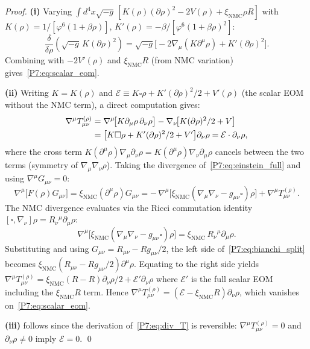 \documentclass[11pt,a4paper]{article}
\theoremstyle{definition}
\theoremstyle{remark}
\newcommand{\vp}{\varphi}
\newcommand{\xNMC}{\xi_{\mathrm{NMC}}}
\begin{document}
\begin{proof}
\textbf{(i)} Varying $\int\!d^4x\sqrt{-g}\,[K(\rho)(\partial\rho)^2 - 2V(\rho) + \xNMC\rho R]$
with $K(\rho)=1/[\vp^6(1+\beta\rho)]$, $K'(\rho)=-\beta/[\vp^6(1+\beta\rho)^2]$:
\begin{equation*}
  \frac{\delta}{\delta\rho}(\sqrt{-g}\,K(\partial\rho)^2)
  = \sqrt{-g}\bigl[-2\nabla_\mu(K\partial^\mu\rho) + K'(\partial\rho)^2\bigr].
\end{equation*}
Combining with $-2V'(\rho)$ and $\xNMC R$ (from NMC variation) gives~\eqref{P7:eq:scalar_eom}.

\textbf{(ii)} Writing $K=K(\rho)$ and $\mathcal{E}\equiv K\square\rho + K'(\partial\rho)^2/2 + V'(\rho)$
(the scalar EOM without the NMC term), a direct computation gives:
\begin{align}
  \nabla^\mu T_{\mu\nu}^{(\rho)}
  &= \nabla^\mu\!\bigl[K\partial_\mu\rho\,\partial_\nu\rho\bigr]
   - \nabla_\nu\!\bigl[K(\partial\rho)^2/2 + V\bigr] \notag\\
  &= \bigl[K\square\rho + K'(\partial\rho)^2/2 + V'\bigr]\partial_\nu\rho
   = \mathcal{E}\cdot\partial_\nu\rho,
  \label{P7:eq:div_T}
\end{align}
where the cross term $K(\partial^\mu\rho)\nabla_\mu\partial_\nu\rho
= K(\partial^\mu\rho)\nabla_\nu\partial_\mu\rho$
cancels between the two terms (symmetry of $\nabla_\mu\nabla_\nu\rho$).
Taking the divergence of~\eqref{P7:eq:einstein_full} and using $\nabla^\mu G_{\mu\nu}=0$:
\begin{equation}
  \nabla^\mu\!\bigl[F(\rho)G_{\mu\nu}\bigr]
  = \xNMC(\partial^\mu\rho)G_{\mu\nu}
  = -\,\nabla^\mu\!\bigl[\xNMC(\nabla_\mu\nabla_\nu - g_{\mu\nu}\square)\rho\bigr]
  + \nabla^\mu T_{\mu\nu}^{(\rho)}.
  \label{P7:eq:bianchi_split}
\end{equation}
The NMC divergence evaluates via the Ricci commutation identity
$[\square,\nabla_\nu]\rho = R_\nu{}^\mu\partial_\mu\rho$:
\begin{equation*}
  \nabla^\mu\!\bigl[\xNMC(\nabla_\mu\nabla_\nu - g_{\mu\nu}\square)\rho\bigr]
  = \xNMC\,R_\nu{}^\mu\partial_\mu\rho.
\end{equation*}
Substituting and using $G_{\mu\nu}=R_{\mu\nu}-Rg_{\mu\nu}/2$, the
left side of~\eqref{P7:eq:bianchi_split} becomes
$\xNMC(R_{\mu\nu}-Rg_{\mu\nu}/2)\partial^\mu\rho$.
Equating to the right side yields
$\nabla^\mu T_{\mu\nu}^{(\rho)} = \xNMC(R-R)\partial_\nu\rho/2 + \mathcal{E}'\partial_\nu\rho$
where $\mathcal{E}'$ is the full scalar EOM including the $\xNMC R$ term.
Hence $\nabla^\mu T_{\mu\nu}^{(\rho)} = (\mathcal{E}-\xNMC R)\partial_\nu\rho$,
which vanishes on~\eqref{P7:eq:scalar_eom}.

\textbf{(iii)} follows since the derivation of~\eqref{P7:eq:div_T} is reversible:
$\nabla^\mu T_{\mu\nu}^{(\rho)}=0$ and $\partial_\nu\rho\neq0$ imply $\mathcal{E}=0$.
\qed
\end{proof}
\end{document}
